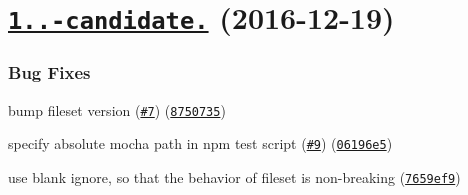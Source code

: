 \label{_1.1.0-candidate.0}%
 \section*{\href{https://github.com/istanbuljs/istanbul-api/compare/v1.1.0-alpha.1...v1.1.0-candidate.0}{\tt 1..-\/candidate.} (2016-\/12-\/19)}

\subsubsection*{Bug Fixes}


\begin{DoxyItemize}
\item bump fileset version (\href{https://github.com/istanbuljs/istanbul-api/issues/7}{\tt \#7}) (\href{https://github.com/istanbuljs/istanbul-api/commit/8750735}{\tt 8750735})
\item specify absolute mocha path in npm test script (\href{https://github.com/istanbuljs/istanbul-api/issues/9}{\tt \#9}) (\href{https://github.com/istanbuljs/istanbul-api/commit/06196e5}{\tt 06196e5})
\item use blank ignore, so that the behavior of fileset is non-\/breaking (\href{https://github.com/istanbuljs/istanbul-api/commit/7659ef9}{\tt 7659ef9}) 
\end{DoxyItemize}